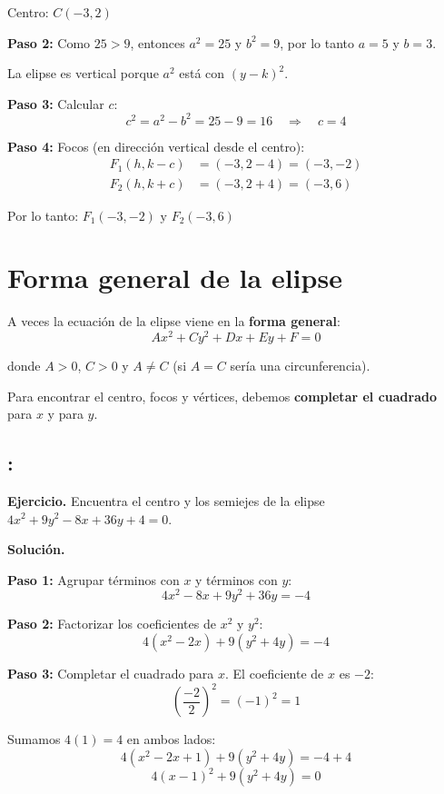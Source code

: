 \documentclass[12pt,a4paper]{article}
\begin{document}
	Centro: $\boxed{C(-3,2)}$

	\textbf{Paso 2:} Como $25>9$, entonces $a^2=25$ y $b^2=9$, por lo tanto $a=5$ y $b=3$.

	La elipse es vertical porque $a^2$ está con $(y-k)^2$.

	\textbf{Paso 3:} Calcular $c$:
	\[
	c^2=a^2-b^2=25-9=16 \quad\Rightarrow\quad c=4
	\]

	\textbf{Paso 4:} Focos (en dirección vertical desde el centro):
	\[
	\begin{aligned}
		F_1(h,k-c)&=(-3,2-4)=(-3,-2)\\
		F_2(h,k+c)&=(-3,2+4)=(-3,6)
	\end{aligned}
	\]

	Por lo tanto: $\boxed{F_1(-3,-2)\text{ y }F_2(-3,6)}$

	\section{Forma general de la elipse}

	A veces la ecuación de la elipse viene en la \textbf{forma general}:
	\[
	Ax^2+Cy^2+Dx+Ey+F=0
	\]

	donde $A>0$, $C>0$ y $A\neq C$ (si $A=C$ sería una circunferencia).

	\bigskip

	Para encontrar el centro, focos y vértices, debemos \textbf{completar el cuadrado} para $x$ y para $y$.

	\subsection*{{\color{blue!40!red}{Ejemplo 5}}: \color{blue!80!black}{Completar el cuadrado en una elipse}}

	\textbf{Ejercicio.} Encuentra el centro y los semiejes de la elipse $4x^2+9y^2-8x+36y+4=0$.

	\bigskip

	\textbf{Solución.}

	\bigskip

	\textbf{Paso 1:} Agrupar términos con $x$ y términos con $y$:
	\[
	4x^2-8x+9y^2+36y=-4
	\]

	\textbf{Paso 2:} Factorizar los coeficientes de $x^2$ y $y^2$:
	\[
	4(x^2-2x)+9(y^2+4y)=-4
	\]

	\textbf{Paso 3:} Completar el cuadrado para $x$. El coeficiente de $x$ es $-2$:
	\[
	\left(\frac{-2}{2}\right)^2=(-1)^2=1
	\]

	Sumamos $4(1)=4$ en ambos lados:
	\[
	4(x^2-2x+1)+9(y^2+4y)=-4+4
	\]
	\[
	4(x-1)^2+9(y^2+4y)=0
	\]
\end{document}
